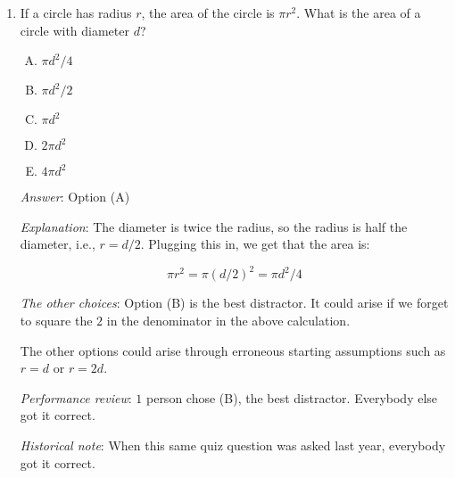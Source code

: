 \documentclass[10pt]{amsart}
\begin{document}
\begin{enumerate}
  {\em Answer}: Option (B)

  {\em Explanation}: We have $f(f(x)) = f(x + 1) = (x + 1) + 1 = x +
  2$.

  {\em Performance review}: Everybody got it correct.

  {\em Historical note}: When this same quiz question was asked last
  year, everybody got it correct.


\item If a circle has radius $r$, the area of the circle is $\pi
  r^2$. What is the area of a circle with diameter $d$?

  \begin{enumerate}[(A)]
  \item $\pi d^2/4$
  \item $\pi d^2/2$
  \item $\pi d^2$
  \item $2\pi d^2$
  \item $4\pi d^2$
  \end{enumerate}

  {\em Answer}: Option (A)

  {\em Explanation}: The diameter is twice the radius, so the radius
  is half the diameter, i.e., $r = d/2$. Plugging this in, we get that the area is:

  $$\pi r^2 = \pi (d/2)^2 = \pi d^2/4$$

  {\em The other choices}: Option (B) is the best distractor. It could
  arise if we forget to square the $2$ in the denominator in the above
  calculation.

  The other options could arise through erroneous starting assumptions
  such as $r = d$ or $r = 2d$.

  {\em Performance review}: $1$ person chose (B), the best
  distractor. Everybody else got it correct.

  {\em Historical note}: When this same quiz question was asked last
  year, everybody got it correct.

\end{enumerate}
\end{document}
